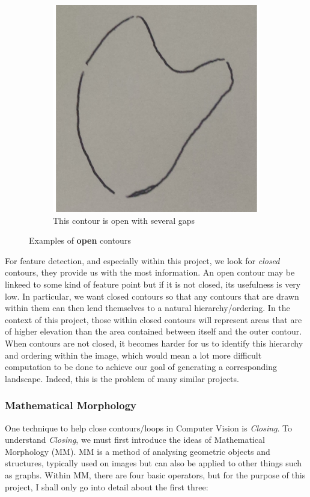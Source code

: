 \documentclass[11pt]{article}
\begin{document}
\begin{figure}[!ht]
\begin{subfigure}[t]{.3\textwidth}
		\centering
		\includegraphics[scale=0.3]{pics/openloop3.png}
		\caption{This contour is open with several gaps}
	\end{subfigure}
	\caption{Examples of \textbf{open} contours}
	\label{fig:opencontours}
\end{figure}

For feature detection, and especially within this project, we look for 
\textit{closed} contours, they provide us with the most information. An open
contour may be linkeed to some kind of feature point but if it is not closed,
its usefulness is very low. In particular, we want closed contours so that any
contours that are drawn within them can then lend themselves to a natural
hierarchy/ordering. In the context of this project, those within closed contours
will represent areas that are of higher elevation than the area contained between
itself and the outer contour. When contours are not closed, it becomes harder
for us to identify this hierarchy and ordering within the image,
which would mean a lot more difficult computation to be done to achieve
our goal of generating a corresponding landscape. Indeed, this is the problem of
many similar projects.

\subsubsection{Mathematical Morphology}
One technique to help close contours/loops in Computer Vision is \textit{Closing}.
To understand \textit{Closing}, we must first introduce the ideas of 
Mathematical Morphology (MM). MM is a method of analysing geometric objects
and structures, typically used on images but can also be applied to other things
such as graphs. Within MM, there are four basic operators, but for the purpose
of this project, I shall only go into detail about the first three:
\end{document}

